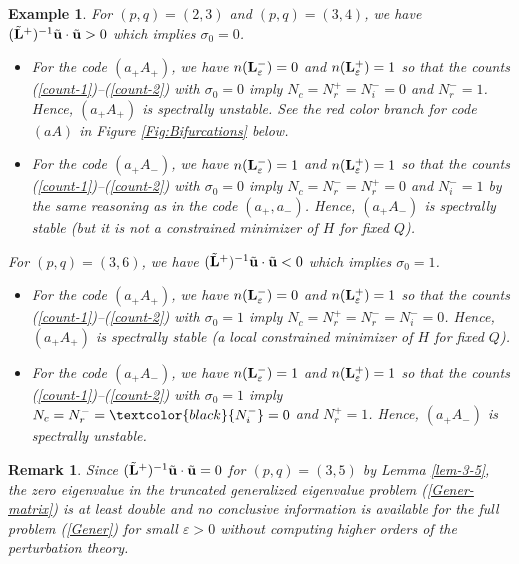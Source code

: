 \documentclass[12pt,reqno]{amsart}
\newtheorem{remark}{Remark}
\newtheorem{example}{Example}
\begin{document}
\begin{example}
	\label{ex-stable-3}
	For $(p,q) = (2,3)$ and $(p,q) = (3,4)$, we have  $	(\tilde{\bf L}^+)^{-1} \tilde{\bf u} \cdot \tilde{\bf u} > 0$ which implies $\sigma_0 = 0$.  
\begin{itemize}
	\item For the code $(a_+A_+)$, we have $n({\bf L}^-_\varepsilon) = 0$ and $n({\bf L}^+_\varepsilon) = 1$ so that the counts (\ref{count-1})--(\ref{count-2}) with $\sigma_0 = 0$ imply 
	$N_c = N_r^+ = N_i^- =0$  and $N_r^-  = 1$. Hence, $(a_+A_+)$ is spectrally unstable. See the red color branch for code $(aA)$ in Figure \ref{Fig:Bifurcations} below.

	\item For the code $(a_+A_-)$, we have  $n({\bf L}^-_\varepsilon) = 1$ and $n({\bf L}^+_\varepsilon) = 1$ so that the counts (\ref{count-1})--(\ref{count-2}) with $\sigma_0 = 0$ imply $N_c = N_r^- = N_r^+ = 0$ and $N_i^- = 1$ by the same reasoning as in the code $(a_+,a_-)$. Hence, $(a_+A_-)$ is spectrally stable  (but it is not a constrained minimizer of $H$ for fixed $Q$).
\end{itemize}
For $(p,q)=(3,6)$, we have  $	(\tilde{\bf L}^+)^{-1} \tilde{\bf u} \cdot \tilde{\bf u} < 0$ which implies $\sigma_0 = 1$. 
\begin{itemize}
	\item For the code $(a_+A_+)$, we have $n({\bf L}^-_\varepsilon) = 0$ and $n({\bf L}^+_\varepsilon) = 1$ so that the counts (\ref{count-1})--(\ref{count-2}) with $\sigma_0 = 1$ imply 
	$N_c = N_r^+ = N_r^- = N_i^- = 0$. Hence, $(a_+A_+)$ is spectrally stable (a local constrained minimizer of $H$ for fixed $Q$).
	\item For the code $(a_+A_-)$, we have  $n({\bf L}^-_\varepsilon) = 1$ and $n({\bf L}^+_\varepsilon) = 1$ so that the counts (\ref{count-1})--(\ref{count-2}) with $\sigma_0 = 1$ imply $N_c = N_r^- =\textcolor{black}{N_i^-} = 0$ and $N_r^+ = 1$. Hence, $(a_+A_-)$ is spectrally unstable.
\end{itemize}
\end{example}

\begin{remark}
Since $(\tilde{\bf L}^+)^{-1} \tilde{\bf u} \cdot \tilde{\bf u} = 0$ for $(p,q) = (3,5)$ by Lemma \ref{lem-3-5}, the zero eigenvalue in the truncated generalized eigenvalue problem (\ref{Gener-matrix}) 
is at least double and no conclusive information is available for 
the full problem (\ref{Gener}) for small $\varepsilon > 0$ without computing higher orders of the perturbation theory.
\end{remark}
\end{document}
